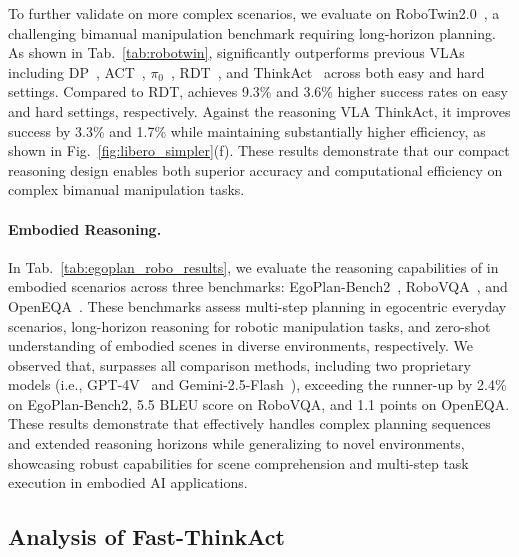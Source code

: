 To further validate \ours{} on more complex scenarios, we evaluate on RoboTwin2.0~\cite{chen2025robotwin2}, a challenging bimanual manipulation benchmark requiring long-horizon planning. As shown in Tab.~\ref{tab:robotwin}, \ours{} significantly outperforms previous VLAs including DP~\cite{chi2023diffusion}, ACT~\cite{zhao2023learning}, $\pi_0$~\cite{black2024pi_0}, RDT~\cite{liu2024rdt}, and ThinkAct~\cite{huang2025thinkact} across both easy and hard settings. Compared to RDT, \ours{} achieves 9.3\% and 3.6\% higher success rates on easy and hard settings, respectively. Against the reasoning VLA ThinkAct, it improves success by 3.3\% and 1.7\% while maintaining substantially higher efficiency, as shown in Fig.~\ref{fig:libero_simpler}(f). These results demonstrate that our compact reasoning design enables both superior accuracy and computational efficiency on complex bimanual manipulation tasks.



\paragraph{Embodied Reasoning.}

In Tab.~\ref{tab:egoplan_robo_results}, we evaluate the reasoning capabilities of \ours{} in embodied scenarios across three benchmarks: EgoPlan-Bench2~\cite{qiu2024egoplan2}, RoboVQA~\cite{sermanet2024robovqa}, and OpenEQA~\cite{majumdar2024openeqa}. These benchmarks assess multi-step planning in egocentric everyday scenarios, long-horizon reasoning for robotic manipulation tasks, and zero-shot understanding of embodied scenes in diverse environments, respectively. We observed that, \ours{} surpasses all comparison methods, including two proprietary models (i.e., GPT-4V~\cite{achiam2023gpt} and Gemini-2.5-Flash~\cite{comanici2025gemini}), exceeding the runner-up by 2.4\% on EgoPlan-Bench2, 5.5 BLEU score on RoboVQA, and 1.1 points on OpenEQA. These results demonstrate that \ours{} effectively handles complex planning sequences and extended reasoning horizons while generalizing to novel environments, showcasing robust capabilities for scene comprehension and multi-step task execution in embodied AI applications.





\subsection{Analysis of Fast-ThinkAct}


